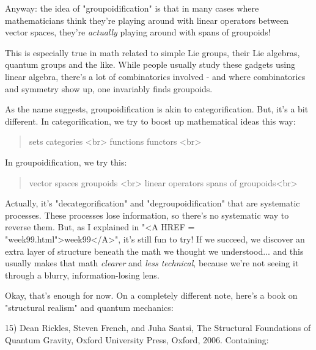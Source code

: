 Anyway: the idea of "groupoidification" is that in many cases where 
mathematicians think they're playing around with linear operators
between vector spaces, they're \emph{actually} playing around with spans of
groupoids!  

This is especially true in math related to simple Lie groups, their
Lie algebras, quantum groups and the like.  While people usually study
these gadgets using linear algebra, there's a lot of combinatorics 
involved - and where combinatorics and symmetry show up, one invariably
finds groupoids.

As the name suggests, groupoidification is akin to categorification.
But, it's a bit different.  In categorification, we try to boost up
mathematical ideas this way:

\begin{quote}
sets \to  categories <br>
functions \to  functors <br>
\end{quote}

In groupoidification, we try this:

\begin{quote}
vector spaces \to  groupoids <br>
linear operators \to  spans of groupoids<br>
\end{quote}

Actually, it's "decategorification" and
"degroupoidification" that are systematic processes.  These
processes lose information, so there's no systematic way to reverse
them.  But, as I explained in "<A HREF =
"week99.html">week99</A>", it's still fun to try!  If we succeed,
we discover an extra layer of structure beneath the math we thought we
understood... and this usually makes that math \emph{clearer} and 
\emph{less technical}, because we're not seeing it through a blurry,
information-losing lens.

Okay, that's enough for now.  On a completely different note, here's
a book on "structural realism" and quantum mechanics:

15) Dean Rickles, Steven French, and Juha Saatsi, The Structural
Foundations of Quantum Gravity, Oxford University Press, Oxford, 
2006.  Containing:

